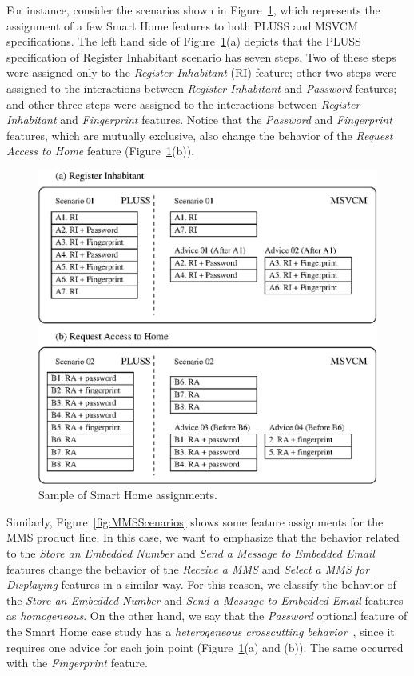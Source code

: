 {\color{blue}
For instance, consider the scenarios shown in
Figure~\ref{fig:smartHomeScenarios}, which represents the assignment of a few Smart Home features to 
both PLUSS and MSVCM specifications. The left hand side of
Figure~\ref{fig:smartHomeScenarios}(a) depicts that the PLUSS specification of
Register Inhabitant scenario has seven steps. Two of these steps were assigned only to the \emph{Register Inhabitant} (RI) feature; other two steps
were assigned to the interactions between \emph{Register Inhabitant} and
\emph{Password} features; and other three steps were assigned to the
interactions between \emph{Register Inhabitant} and \emph{Fingerprint}
features. Notice that the \emph{Password} and \emph{Fingerprint} features, which
are mutually exclusive, also change the behavior of the \emph{Request Access to
Home} feature (Figure~\ref{fig:smartHomeScenarios}(b)).


\begin{figure}[th]
 \begin{center}
  \includegraphics[scale=0.65]{img/comparisonScenarios.eps}
  \caption{Sample of Smart Home assignments.}
  \label{fig:smartHomeScenarios}
  \end{center}
\end{figure}

Similarly, Figure~\ref{fig:MMSScenarios} shows some feature assignments for the
MMS product line. In this case, we want to emphasize that the behavior related to
the \emph{Store an Embedded Number} and \emph{Send a Message to Embedded Email} 
features change the behavior of the \emph{Receive a MMS} and \emph{Select a
MMS for Displaying} features in a similar way. For this reason, we
classify the behavior of the \emph{Store an Embedded Number} and \emph{Send
a Message to Embedded Email} features as \emph{homogeneous}. On the other hand,
we say that the \emph{Password} optional feature of the Smart Home case study has a
\emph{heterogeneous crosscutting behavior}~\cite{Apel:2006aa}, since it requires one advice for each join point (Figure~\ref{fig:smartHomeScenarios}(a) and (b)). The same occurred with the \emph{Fingerprint} feature.

}
